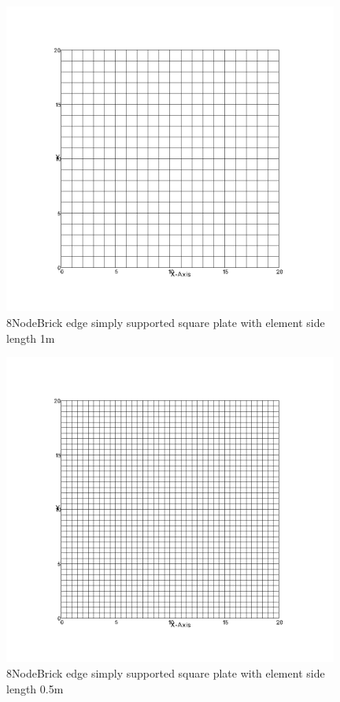 \documentclass[fleqn,11pt,letter]{article}
\begin{document}
\newpage

\begin{figure}[H]
  \centering
  \includegraphics[width=11cm]{../Figure_files/8NodeBrick/square_plate4.png}
  \caption{8NodeBrick edge simply supported square plate with element side length 1m }
  \label{fig 8NodeBrick edges simply supported square plate with element side length 1m }
\end{figure}


\begin{figure}[H]
  \centering
  \includegraphics[width=11cm]{../Figure_files/8NodeBrick/square_plate5.png}
  \caption{8NodeBrick edge simply supported square plate with element side length 0.5m }
  \label{fig 8NodeBrick edges simply supported square plate with element side length 0.5m }
\end{figure}
\end{document}
